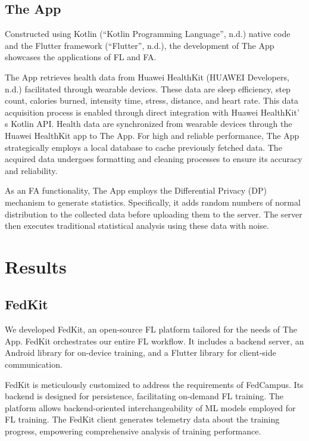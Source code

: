 \documentclass{article}
\begin{document}
\begin{multicols}{2}
\subsection{The App}

Constructed using Kotlin (``Kotlin Programming Language'', n.d.) native
code and the Flutter framework (``Flutter'', n.d.), the development of
The App showcases the applications of FL and FA.

The App retrieves health data from Huawei HealthKit (HUAWEI Developers,
n.d.) facilitated through wearable devices. These data are sleep
efficiency, step count, calories burned, intensity time, stress,
distance, and heart rate. This data acquisition process is enabled
through direct integration with Huawei HealthKit' s
Kotlin API. Health data are synchronized from wearable devices through
the Huawei HealthKit app to The App. For high and reliable performance,
The App strategically employs a local database to cache previously
fetched data. The acquired data undergoes formatting and cleaning
processes to ensure its accuracy and reliability.

As an FA functionality, The App employs the Differential Privacy (DP)
mechanism to generate statistics. Specifically, it adds random numbers
of normal distribution to the collected data before uploading them to
the server. The server then executes traditional statistical analysis
using these data with noise.

\section{Results}

\subsection{FedKit}

We developed FedKit, an open-source FL platform tailored for the needs
of The App. FedKit orchestrates our entire FL workflow. It includes a
backend server, an Android library for on-device training, and a Flutter
library for client-side communication.

FedKit is meticulously customized to address the requirements of
FedCampus. Its backend is designed for persistence, facilitating
on-demand FL training. The platform allows backend-oriented
interchangeability of ML models employed for FL training. The FedKit
client generates telemetry data about the training progress, empowering
comprehensive analysis of training performance.


\end{multicols}
\end{document}
